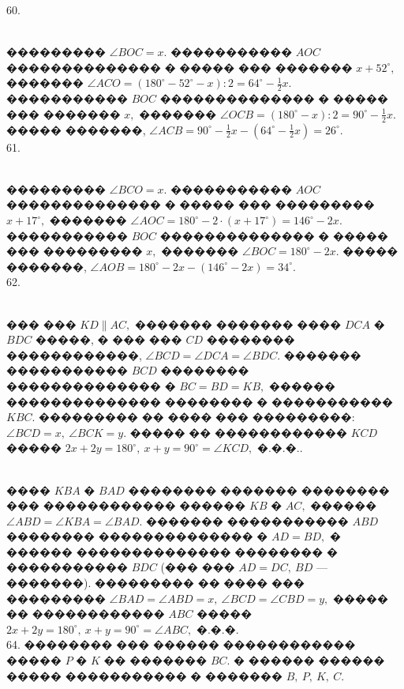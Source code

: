\documentclass[12pt]{article}
\begin{document}
60. \begin{figure}[ht!]
\end{figure}\\
��������� $\angle BOC=x.$ ����������� $AOC$ �������������� � ����� ��� ������� $x+52^\circ,$ ������� $\angle ACO=(180^\circ-52^\circ-x):2=64^\circ-\frac{1}{2}x.$ ����������� $BOC$ �������������� � ����� ��� ������� $x,$ ������� $\angle OCB=(180^\circ-x):2=90^\circ-\frac{1}{2}x.$ ����� �������, $\angle ACB=90^\circ-\frac{1}{2}x-(64^\circ-\frac{1}{2}x)=26^\circ.$\\
61. \begin{figure}[ht!]
\end{figure}\\
��������� $\angle BCO=x.$ ����������� $AOC$ �������������� � ����� ��� ��������� $x+17^\circ,$ ������� $\angle AOC=180^\circ-2\cdot(x+17^\circ)=146^\circ-2x.$ ����������� $BOC$ �������������� � ����� ��� ��������� $x,$ ������� $\angle BOC=180^\circ-2x.$ ����� �������, $\angle AOB=180^\circ-2x-(146^\circ-2x)=34^\circ.$\\
62. \begin{figure}[ht!]
\end{figure}\\
��� ��� $KD\parallel AC,$ ������� ������� ���� $DCA$ � $BDC$ �����, � ��� ��� $CD$ �������� ������������, $\angle BCD=\angle DCA=\angle BDC.$ ������� ����������� $BCD$ �������� �������������� � $BC=BD=KB,$ ������ �������������� �������� � ����������� $KBC.$ ��������� �� ���� ��� ���������: $\angle BCD=x,\ \angle BCK=y.$ ����� �� ������������ $KCD$ ����� $2x+2y=180^\circ,\ x+y=90^\circ=\angle KCD,$ �.�.�.\newpage{}. \begin{figure}[ht!]
\end{figure}\\
���� $KBA$ � $BAD$ �������� ������� �������� ��� ������������ ������ $KB$ � $AC,$ ������ $\angle ABD=\angle KBA=\angle BAD.$ ������� ����������� $ABD$ �������� �������������� � $AD=BD,$ � ������ �������������� �������� � ����������� $BDC$ (��� ��� $AD=DC,\ BD$ --- �������). ��������� �� ���� ��� ��������� $\angle BAD=\angle ABD=x,\ \angle BCD=\angle CBD=y,$ ����� �� ������������ $ABC$ ����� $2x+2y=180^\circ,\ x+y=90^\circ=\angle ABC,$ �.�.�.\\
64. �������� ��� ������ ������������ ����� $P$ � $K$ �� ������� $BC.$ � ������ ������ ����� ����������� � ������� $B,\ P,\ K,\ C.$
\end{document}
